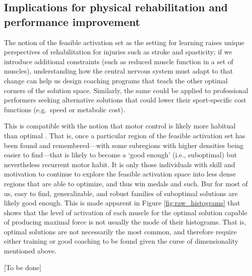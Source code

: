 \documentclass[10pt,letterpaper]{article}
\begin{document}
\subsection*{Implications for physical rehabilitation and performance improvement}
The notion of the feasible activation set as the setting for learning raises unique perspectives of rehabilitation for injuries such as stroke and spasticity; if we introduce additional constraints (such as reduced muscle function in a set of muscles), understanding how the central nervous system must adapt to that change can help us design coaching programs that teach the other optimal corners of the solution space. Similarly, the same could be applied to professional performers seeking alternative solutions that could lower their sport-specific cost functions (e.g.\ speed or metabolic cost).

This is compatible with the notion that motor control is likely more habitual than optimal \cite{deRugy2012habitual}. That is, once a particular region of the feasible activation set has been found and remembered---with some subregions with higher densities being easier to find---that is likely to become a `good enough' (i.e., suboptimal) but nevertheless recurrent motor habit. It is only those individuals with skill and motivation to continue to explore the feasible activation space into less dense regions that are able to optimize, and thus win medals and such. Bur for most of us,  easy to find, generalizable, and robust families of suboptimal solutions are likely good enough.  This is made apparent in Figure \ref{fig:raw_histograms} that shows that the level of activation of each muscle for the optimal solution capable of producing maximal  force is not usually the mode of their histograms. That is, optimal solutions are not necessarily the most common, and therefore require either training or good coaching to be found given the curse of dimensionality mentioned above.


[To be done]

\end{document}
